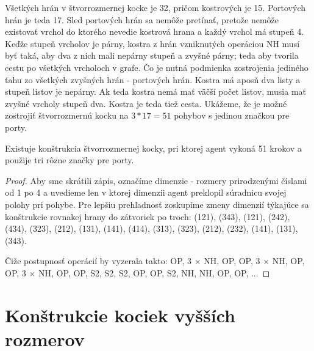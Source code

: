 Všetkých hrán v štvorrozmernej kocke je 32, pričom kostrových je 15.
Portových hrán je teda 17. Sled portových hrán sa nemôže pretínať, pretože
nemôže existovať vrchol do ktorého nevedie kostrová hrana a každý vrchol má
stupeň 4. Keďže stupeň vrcholov je párny, kostra z hrán vzniknutých
operáciou NH musí byť taká, aby
dva z nich mali nepárny stupeň a zvyšné párny; teda aby tvorila cestu po
všetkých vrcholoch v grafe. Čo je nutná podmienka zostrojenia
jediného ťahu zo všetkých zvyšných hrán - portových hrán. 
Kostra má aposň dva listy a stupeň listov je nepárny. 
Ak teda kostra nemá mať väčší počet listov, musia mať
zvyšné vrcholy stupeň dva. Kostra je teda tiež cesta. Ukážeme, že je možné
zostrojiť štvorrozmernú kocku na $3 * 17 = 51$ pohybov s jedinou značkou pre
porty. 
\begin{veta}
Existuje konštrukcia štvorrozmernej kocky, pri ktorej agent vykoná 51 krokov
a použije tri rôzne značky pre porty.
\end{veta}
\begin{proof}
Aby sme skrátili zápis, označíme dimenzie - rozmery prirodzenými číslami od 1 po 4 a
uvedieme len v ktorej dimenzii agent preklopil súradnicu svojej polohy pri
pohybe. Pre lepšiu prehľadnosť zoskupíme zmeny dimenzií týkajúce sa konštrukcie
rovnakej hrany do zátvoriek po troch: (121), (343), (121), (242), (434),
(323), (212), (131), (141), (414), (313), (323), (212), (232), (141), (131),
(343).

Čiže postupnosť operácií by vyzerala takto: OP, 3 $\times$ NH, OP, OP, 3 $\times$
NH, OP, OP, 3 $\times$ NH, OP, OP, S2, S2, S2, OP, OP, S2, NH, NH, OP, OP,
...
\end{proof}

\section{Konštrukcie kociek vyšších rozmerov}


\iffalse

\fi